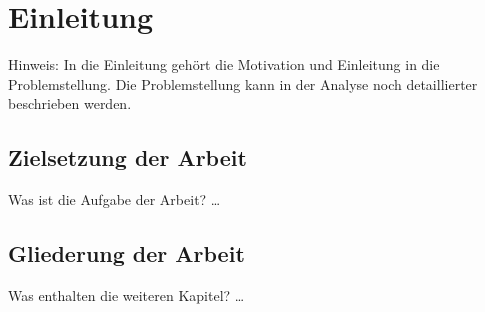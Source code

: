
\chapter{Einleitung}
\label{ch:Einleitung}
Hinweis: In die Einleitung geh{\"o}rt die Motivation 
und Einleitung in die Problemstellung. Die Problemstellung
kann in der Analyse noch detaillierter beschrieben werden.


\section{Zielsetzung der Arbeit}
\label{ch:Einleitung:sec:Zielsetzung}

Was ist die Aufgabe der Arbeit? \ldots




\section{Gliederung der Arbeit}
\label{ch:Einleitung:sec:Gliederung}

Was enthalten die weiteren Kapitel? \ldots



